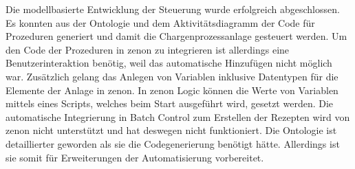 Die modellbasierte Entwicklung der Steuerung wurde erfolgreich abgeschlossen. Es konnten aus der Ontologie und dem Aktivitätsdiagramm der Code für Prozeduren generiert und damit die Chargenprozessanlage gesteuert werden. Um den Code der Prozeduren in zenon zu integrieren ist allerdings eine Benutzerinteraktion benötig, weil das automatische Hinzufügen nicht möglich war. Zusätzlich gelang das Anlegen von Variablen inklusive Datentypen für die Elemente der Anlage in zenon. In zenon Logic können die Werte von Variablen mittels eines Scripts, welches beim Start ausgeführt wird, gesetzt werden. 
Die automatische Integrierung in Batch Control zum Erstellen der Rezepten wird von zenon nicht unterstützt und hat deswegen nicht funktioniert.
Die Ontologie ist detaillierter geworden als sie die Codegenerierung benötigt hätte. Allerdings ist sie somit für Erweiterungen der Automatisierung vorbereitet. 


















